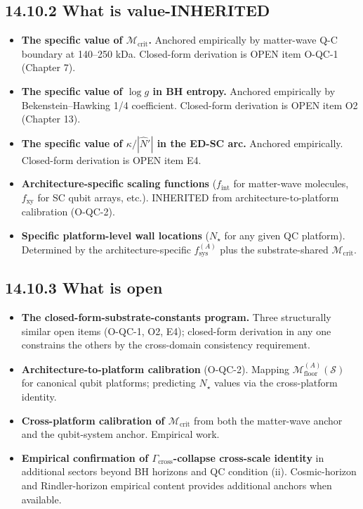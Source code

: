 \documentclass[11pt]{book}
\begin{document}
\subsection{14.10.2 What is value-INHERITED}

\begin{itemize}
\item \textbf{The specific value of $\mathcal{M}_\mathrm{crit}$.} Anchored empirically by matter-wave Q-C boundary at 140–250 kDa. Closed-form derivation is OPEN item O-QC-1 (Chapter 7).
\item \textbf{The specific value of $\log g$ in BH entropy.} Anchored empirically by Bekenstein–Hawking 1/4 coefficient. Closed-form derivation is OPEN item O2 (Chapter 13).
\item \textbf{The specific value of $\kappa/|\hat{N}'|$ in the ED-SC arc.} Anchored empirically. Closed-form derivation is OPEN item E4.
\item \textbf{Architecture-specific scaling functions} ($f_\mathrm{int}$ for matter-wave molecules, $f_\mathrm{xy}$ for SC qubit arrays, etc.). INHERITED from architecture-to-platform calibration (O-QC-2).
\item \textbf{Specific platform-level wall locations} ($N_\star$ for any given QC platform). Determined by the architecture-specific $f_\mathrm{sys}^{(A)}$ plus the substrate-shared $\mathcal{M}_\mathrm{crit}$.
\end{itemize}

\subsection{14.10.3 What is open}

\begin{itemize}
\item \textbf{The closed-form-substrate-constants program.} Three structurally similar open items (O-QC-1, O2, E4); closed-form derivation in any one constrains the others by the cross-domain consistency requirement.
\item \textbf{Architecture-to-platform calibration} (O-QC-2). Mapping $\mathcal{M}_\mathrm{floor}^{(A)}(\mathcal{S})$ for canonical qubit platforms; predicting $N_\star$ values via the cross-platform identity.
\item \textbf{Cross-platform calibration of $\mathcal{M}_\mathrm{crit}$} from both the matter-wave anchor and the qubit-system anchor. Empirical work.
\item \textbf{Empirical confirmation of $\Gamma_\mathrm{cross}$-collapse cross-scale identity} in additional sectors beyond BH horizons and QC condition (ii). Cosmic-horizon and Rindler-horizon empirical content provides additional anchors when available.
\end{itemize}
\end{document}
